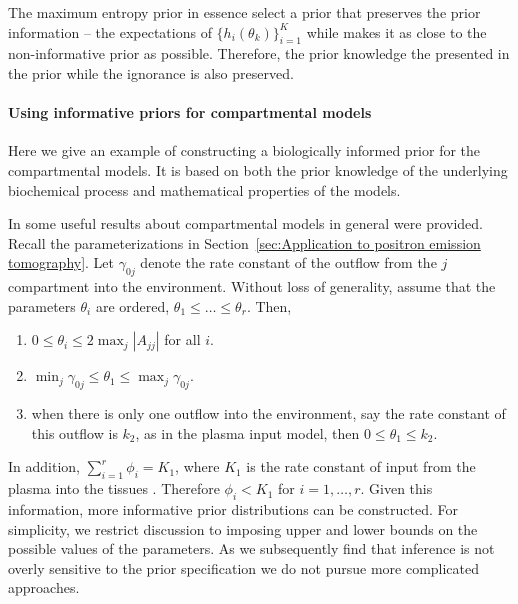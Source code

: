 The maximum entropy prior in essence select a prior that preserves the prior
information -- the expectations of $\{h_i(\theta_k)\}_{i=1}^K$ while makes
it as close to the non-informative prior as possible. Therefore, the prior
knowledge the presented in the prior while the ignorance is also preserved.

\paragraph{Using informative priors for \pet compartmental models}

Here we give an example of constructing a biologically informed prior for the
\pet compartmental models. It is based on both the prior knowledge of the
underlying biochemical process and mathematical properties of the models.

In \cite{Anderson:1983wk} some useful results about compartmental models in
general were provided. Recall the parameterizations in
Section~\ref{sec:Application to positron emission tomography}. Let
$\gamma_{0j}$ denote the rate constant of the outflow from the $j$\xth
compartment into the environment.  Without loss of generality, assume that the
parameters $\theta_i$ are ordered, $\theta_1 \le \dots \le \theta_r$. Then,
\begin{enumerate}
  \item $0 \le \theta_i \le 2\max_j|A_{jj}|$ for all $i$.
  \item $\min_j\gamma_{0j} \le \theta_1 \le \max_j\gamma_{0j}$.
  \item when there is only one outflow into the environment, say the rate
    constant of this outflow is $k_2$, as in the plasma input model, then $0
    \le \theta_1 \le k_2$.
\end{enumerate}
In addition, $\sum_{i=1}^r \phi_i = K_1$, where $K_1$ is the rate constant of
input from the plasma into the tissues \cite{Gunn:2001cx}. Therefore $\phi_i <
K_1$ for $i = 1, \dots, r$. Given this information, more informative prior
distributions can be constructed. For simplicity, we restrict discussion to
imposing upper and lower bounds on the possible values of the parameters. As
we subsequently find that inference is not overly sensitive to the prior
specification we do not pursue more complicated approaches.

